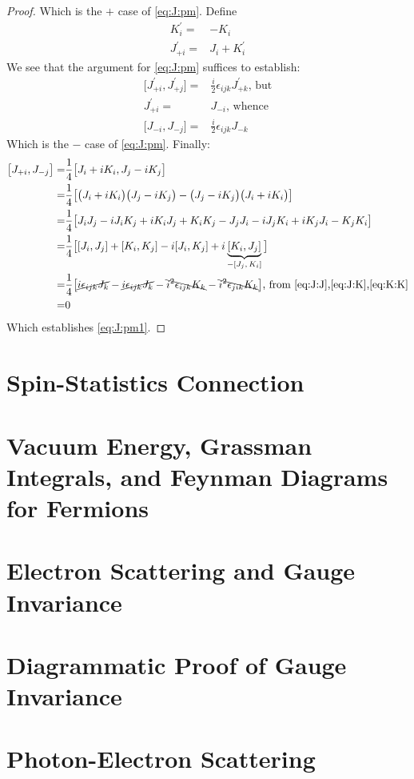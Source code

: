 \documentclass[]{article}
\begin{document}
\begin{proof}
	Which is the $+$ case of \eqref{eq:J:pm}. Define
	\begin{align*}
		K_i^\prime =& - K_i\\
		J_{+i}^\prime =& J_i +  K_i^\prime
	\end{align*}
	We see that the argument for \eqref{eq:J:pm} suffices to establish:
	\begin{align*}
		\big[J_{+ i}^\prime, J_{+ j}^\prime\big] =&  \frac{i}{2} \epsilon_{ijk}J_{+ k} ^\prime \text{, but}\\
		J_{+i}^\prime =& J_{-i}\text{, whence}\\
		\big[J_{- i}, J_{- j} \big] =&  \frac{i}{2} \epsilon_{ijk}J_{- k}
	\end{align*}
	Which is the $-$ case of \eqref{eq:J:pm}. Finally:
	\begin{align*}
		\big[J_{+ i},	J_{- j}\big]  = & \frac{1}{4}\big[J_i+ i K_i,J_j- i K_j\big]\\
		= & \frac{1}{4} \big[\big(J_i+ i K_i\big)\big(J_j- i K_j\big)-\big(J_j- i K_j\big)\big(J_i+ i K_i\big)\big]\\
		= & \frac{1}{4} \big[J_iJ_j -i J_iK_j +iK_iJ_j+K_iK_j - J_jJ_i -iJ_j K_i+iK_jJ_i-K_jK_i\big] \\
		= & \frac{1}{4} \big[[J_i,J_j] +[K_i,K_j]  -i[J_i,K_j] +i \underbrace{[K_i,J_j]}_\text{$-[J_j,K_i]$}\big] \\
		= & \frac{1}{4} \big[\cancel{i\epsilon_{ijk}J_k} - \cancel{i\epsilon_{ijk}J_k} -\bcancel{i^2\epsilon_{ijk}K_k} -\bcancel{i^2\epsilon_{jik}K_k}\big]\text{, from \eqref{eq:J:J},\eqref{eq:J:K},\eqref{eq:K:K}} \\
		=& 0
	\end{align*}
	Which establishes \eqref{eq:J:pm1}.
\end{proof}

\section{Spin-Statistics Connection}
\section{Vacuum Energy, Grassman Integrals, and Feynman Diagrams for Fermions}
\section{Electron Scattering and Gauge Invariance}
\section{Diagrammatic Proof of Gauge Invariance}
\section{Photon-Electron Scattering}


\raggedright

\end{document}
